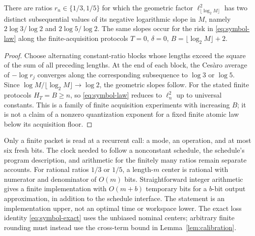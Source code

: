 \begin{corollary}\label{cor:no-exponent}
There are ratios $r_n\in\{1/3,1/5\}$ for which the geometric factor $\ell_{\lfloor\log_2M\rfloor}^2$ has two distinct subsequential values of its negative logarithmic slope in $M$, namely $2\log3/\log2$ and $2\log5/\log2$. The same slopes occur for the risk in \eqref{eq:symbol-law} along the finite-acquisition protocols $T=0$, $\delta=0$, $B=\lfloor\log_2M\rfloor+2$.
\end{corollary}
\begin{proof}
Choose alternating constant-ratio blocks whose lengths exceed the square of the sum of all preceding lengths. At the end of each block, the Ces\`aro average of $-\log r_j$ converges along the corresponding subsequence to $\log3$ or $\log5$. Since $\log M/\lfloor\log_2M\rfloor\to\log2$, the geometric slopes follow. For the stated finite protocols $H_T=B\ge n$, so \eqref{eq:symbol-law} reduces to $\ell_n^2$ up to universal constants. This is a family of finite acquisition experiments with increasing $B$; it is not a claim of a nonzero quantization exponent for a fixed finite atomic law below its acquisition floor.
\end{proof}

Only a finite packet is read at a recurrent call: a mode, an operation, and at most six fresh bits. The clock needed to follow a nonconstant schedule, the schedule's program description, and arithmetic for the finitely many ratios remain separate accounts. For rational ratios $1/3$ or $1/5$, a length-$m$ center is rational with numerator and denominator of $O(m)$ bits. Straightforward integer arithmetic gives a finite implementation with $O(m+b)$ temporary bits for a $b$-bit output approximation, in addition to the schedule interface. The statement is an implementation upper, not an optimal time or workspace lower. The exact loss identity \eqref{eq:symbol-exact} uses the unbiased nominal centers; arbitrary finite rounding must instead use the cross-term bound in Lemma~\ref{lem:calibration}.
